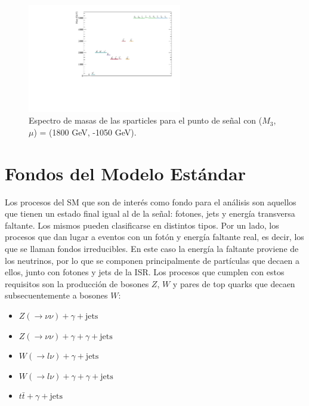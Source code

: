 \begin{figure}
  \centering
  \includegraphics[width=0.6\textwidth]{images/analysis/phb_mass_spectrum.pdf}
  \caption{Espectro de masas de las sparticles para el punto de señal con ($M_3$, $\mu$) = (1800 GeV, -1050 GeV). }
  \label{fig:mass_spec}
\end{figure}



\section{Fondos del Modelo Estándar}


Los procesos del SM que son de interés como fondo para el análisis son aquellos que tienen un estado final igual al de la señal: fotones, jets y energía transversa faltante. Los mismos pueden clasificarse en distintos tipos. Por un lado, los procesos que dan lugar a eventos con un fotón y energía faltante real, es decir, los que se llaman fondos irreducibles. En este caso la energía la faltante proviene de los neutrinos, por lo que se componen principalmente de partículas que decaen a ellos, junto con fotones y jets de la ISR. Los procesos que cumplen con estos requisitos son la producción de bosones $Z$, $W$ y pares de top quarks que decaen subsecuentemente a bosones $W$:

\begin{itemize}
  \item $Z(\rightarrow \nu\nu) + \gamma + \text{jets}$
  \item $Z(\rightarrow \nu\nu) + \gamma + \gamma + \text{jets}$
  \item $W(\rightarrow l\nu) + \gamma + \text{jets}$
  \item $W(\rightarrow l\nu) + \gamma + \gamma + \text{jets}$
  \item $t\bar{t} + \gamma + \text{jets}$
\end{itemize}


